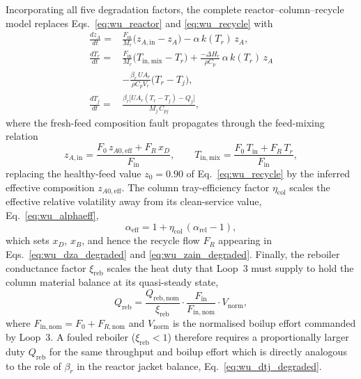 \documentclass[aps,pre,twocolumn,superscriptaddress]{revtex4-2}
\begin{document}
Incorporating all five degradation factors, the complete reactor--column--recycle
model replaces Eqs.~\eqref{eq:wu_reactor} and \eqref{eq:wu_recycle} with
%
\begin{subequations}
\label{eq:wu_degraded}
\begin{align}
  \frac{dz_A}{dt}
    =& \frac{F_\mathrm{in}}{M_r}\bigl(z_{A,\mathrm{in}} - z_A\bigr)
       - \alpha\,k(T_r)\,z_A,
  \label{eq:wu_dza_degraded} \\[4pt]
  \frac{dT_r}{dt}
    =& \frac{F_\mathrm{in}}{M_r}\bigl(T_\mathrm{in,mix} - T_r\bigr)
       + \frac{-\Delta H_r}{\rho C_p}\,\alpha\,k(T_r)\,z_A \nonumber \\
     & - \frac{\beta_r\,U\!A_r}{\rho C_p V_r}\bigl(T_r - T_j\bigr),
  \label{eq:wu_dtr_degraded} \\[4pt]
  \frac{dT_j}{dt}
    =& \frac{\beta_r\bigl[U\!A_r(T_r - T_j) - Q_j\bigr]}{M_j\,C_{pj}},
  \label{eq:wu_dtj_degraded}
\end{align}
\end{subequations}
%
where the fresh-feed composition fault propagates through the feed-mixing relation
%
\begin{equation}
  z_{A,\mathrm{in}} = \frac{F_0\,z_{A0,\mathrm{eff}} + F_R\,x_D}{F_\mathrm{in}},
  \qquad
  T_\mathrm{in,mix} = \frac{F_0\,T_\mathrm{in} + F_R\,T_r}{F_\mathrm{in}},
  \label{eq:wu_zain_degraded}
\end{equation}
%
replacing the healthy-feed value $z_0 = 0.90$ of Eq.~\eqref{eq:wu_recycle} by the inferred effective composition $z_{A0,\mathrm{eff}}$.  The column tray-efficiency
factor $\eta_\mathrm{col}$ scales the effective relative volatility away from its clean-service value, Eq.~\eqref{eq:wu_alphaeff},
%
\begin{equation}
  \alpha_\mathrm{eff} = 1 + \eta_\mathrm{col}\,(\alpha_\mathrm{rel} - 1),
  \label{eq:wu_alphaeff_degraded}
\end{equation}
%
which sets $x_D$, $x_B$, and hence the recycle flow $F_R$ appearing in Eqs.~\eqref{eq:wu_dza_degraded} and \eqref{eq:wu_zain_degraded}.  Finally, the
reboiler conductance factor $\xi_\mathrm{reb}$ scales the heat duty that Loop~3 must supply to hold the column material balance at its quasi-steady state,
%
\begin{equation}
  Q_\mathrm{reb} = \frac{Q_{\mathrm{reb,nom}}}{\xi_\mathrm{reb}}\cdot
    \frac{F_\mathrm{in}}{F_{\mathrm{in,nom}}}\cdot V_\mathrm{norm},
  \label{eq:wu_qreb_degraded}
\end{equation}
%
where $F_{\mathrm{in,nom}} = F_0 + F_{R,\mathrm{nom}}$ and $V_\mathrm{norm}$ is the normalised boilup effort commanded by Loop~3. A fouled reboiler ($\xi_\mathrm{reb} < 1$) therefore requires a proportionally larger duty $Q_\mathrm{reb}$ for the same throughput and boilup effort which is directly analogous to the role of $\beta_r$ in the reactor jacket balance, Eq.~\eqref{eq:wu_dtj_degraded}.
\end{document}
